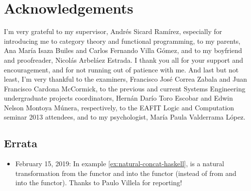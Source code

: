 \chapter{Acknowledgements}
\label{chap:acknowledgements}

I'm very grateful to my supervisor, Andrés Sicard Ramírez, especially
for introducing me to category theory and functional programming, to
my parents, Ana María Isaza Builes and Carlos Fernando Villa Gómez,
and to my boyfriend and proofreader, Nicolás Arbeláez Estrada. I thank
you all for your support and encouragement, and for not running out of
patience with me. And last but not least, I'm very thankful to the
examiners, Francisco José Correa Zabala and Juan Francisco Cardona
McCormick, to the previous and current Systems Engineering
undergraduate projects coordinators, Hernán Darío Toro Escobar and
Edwin Nelson Montoya Múnera, respectively, to the EAFIT Logic and
Computation seminar 2013 attendees, and to my psychologist, María
Paula Valderrama López.

\section*{Errata}

\begin{itemize}
\item
  February 15, 2019:
  In example \ref{ex:natural-concat-haskell},  is a natural
  transformation from the  functor and into the
  \texthaskell{[]} functor (instead of from and into the \texthaskell{[]}
  functor). Thanks to Paulo Villela for reporting!
\end{itemize}

\clearemptydoublepage
